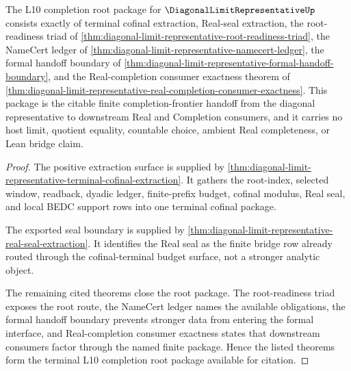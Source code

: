 \begin{theorem}
\label{thm:diagonal-limit-representative-l10-completion-root-package}
The L10 completion root package for $\DiagonalLimitRepresentativeUp$ consists exactly of terminal cofinal extraction, Real-seal extraction, the root-readiness triad of \autoref{thm:diagonal-limit-representative-root-readiness-triad}, the NameCert ledger of \autoref{thm:diagonal-limit-representative-namecert-ledger}, the formal handoff boundary of \autoref{thm:diagonal-limit-representative-formal-handoff-boundary}, and the Real-completion consumer exactness theorem of \autoref{thm:diagonal-limit-representative-real-completion-consumer-exactness}. This package is the citable finite completion-frontier handoff from the diagonal representative to downstream Real and Completion consumers, and it carries no host limit, quotient equality, countable choice, ambient Real completeness, or Lean bridge claim.
\end{theorem}
\begin{proof}
The positive extraction surface is supplied by \autoref{thm:diagonal-limit-representative-terminal-cofinal-extraction}. It gathers the root-index, selected window, readback, dyadic ledger, finite-prefix budget, cofinal modulus, Real seal, and local BEDC support rows into one terminal cofinal package.

The exported seal boundary is supplied by \autoref{thm:diagonal-limit-representative-real-seal-extraction}. It identifies the Real seal as the finite bridge row already routed through the cofinal-terminal budget surface, not a stronger analytic object.

The remaining cited theorems close the root package. The root-readiness triad exposes the root route, the NameCert ledger names the available obligations, the formal handoff boundary prevents stronger data from entering the formal interface, and Real-completion consumer exactness states that downstream consumers factor through the named finite package. Hence the listed theorems form the terminal L10 completion root package available for citation.
\end{proof}
